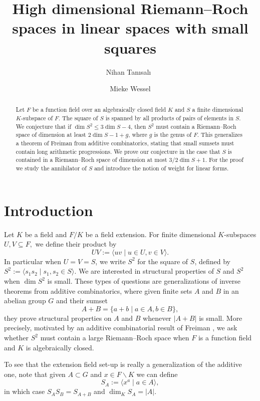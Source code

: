 \documentclass[12pt]{amsart}
\title
{High dimensional Riemann--Roch spaces in linear spaces with small squares}
\author{Nihan Tan\i sal\i~}
\author{Mieke Wessel}
\date{}
\renewcommand{\leq}{\leqslant}
\theoremstyle{definition}
\begin{document}
	
	\begin{abstract}
		Let $F$ be a function field over an algebraically closed field $K$ and $S$ a finite dimensional $K$-subspace of $F$. The square of $S$ is spanned by all products of pairs of elements in $S$. We conjecture that if $\dim S^2 \leq 3 \dim S - 4$, then $S^2$ must contain a Riemann--Roch space of dimension at least $2 \dim S - 1 + g$, where $g$ is the genus of $F$. This generalizes a theorem of Freiman from additive combinatorics, stating that small sumsets must contain long arithmetic progressions. We prove our conjecture in the case that $S$ is contained in a Riemann--Roch space of dimension at most $3/2\dim S + 1$. For the proof we study the annihilator of $S$ and introduce the notion of weight for linear forms. 
	\end{abstract}
	
	\maketitle
	\section{Introduction}
	Let $K$ be a field and $F/K$  be a field extension. For finite dimensional  $K$-subspaces $U,V \subseteq F,$ we define their product by 
	$$U V := \langle uv  \mid u \in U ,v \in V  \rangle. $$
	In particular when $U=V=S$, we write $S^2$ for the square of $S$, defined by  
	$ S^2 := \langle s_1s_2 \mid s_1, s_2 \in S \rangle.$
	We are interested in structural properties of $S$ and $S^2$ when $\dim S^2$ is small. These types of questions are generalizations of inverse theorems from additive combinatorics, where given finite sets $A$ and $B$ in an abelian group $G$ and their sumset $$A + B = \{ a + b \mid a \in A, b\in B \},$$ they prove structural properties on $A$ and $B$ whenever $|A+B|$ is small. More precisely, motivated by an additive combinatorial result of Freiman \cite{Freiman2009intcase}, we ask whether $S^2$ must contain a large Riemann--Roch space when $F$ is a function field and $K$ is algebraically closed.
	
	To see that the extension field set-up is really a generalization of the additive one, note that given $A \subset G$ and $x \in F \backslash K$ we can define $$S_A := \langle x^a \mid a \in A \rangle,$$ 
	in which case $S_AS_B = S_{A+B}$ and $\dim_K S_A = |A|$. 
	
\end{document}
